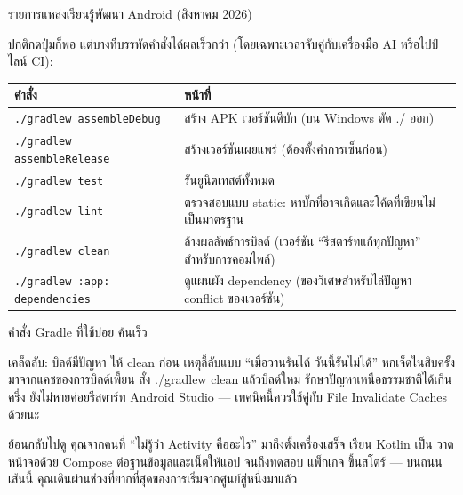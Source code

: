 \begin{center}\small\color{gray}รายการแหล่งเรียนรู้พัฒนา Android (สิงหาคม 2026)\end{center}


ปกติกดปุ่มก็พอ แต่บางทีบรรทัดคำสั่งได้ผลเร็วกว่า (โดยเฉพาะเวลาจับคู่กับเครื่องมือ AI หรือไปป์ไลน์ CI):

\begin{center}
\begin{tabularx}{\linewidth}{|X|X|}
\hline
\textbf{คำสั่ง} & \textbf{หน้าที่} \tabularnewline
\hline
\texttt{.\allowbreak /\allowbreak gradlew assembleDebug} & สร้าง APK เวอร์ชันดีบัก (บน Windows ตัด ./ ออก) \tabularnewline
\texttt{.\allowbreak /\allowbreak gradlew assembleRelease} & สร้างเวอร์ชันเผยแพร่ (ต้องตั้งค่าการเซ็นก่อน) \tabularnewline
\texttt{.\allowbreak /\allowbreak gradlew test} & รันยูนิตเทสต์ทั้งหมด \tabularnewline
\texttt{.\allowbreak /\allowbreak gradlew lint} & ตรวจสอบแบบ static: หาบั๊กที่อาจเกิดและโค้ดที่เขียนไม่เป็นมาตรฐาน \tabularnewline
\texttt{.\allowbreak /\allowbreak gradlew clean} & ล้างผลลัพธ์การบิลด์ (เวอร์ชัน “รีสตาร์ทแก้ทุกปัญหา” สำหรับการคอมไพล์) \tabularnewline
\texttt{.\allowbreak /\allowbreak gradlew :app: dependencies} & ดูแผนผัง dependency (ของวิเศษสำหรับไล่ปัญหา conflict ของเวอร์ชัน) \tabularnewline
\hline
\end{tabularx}
\end{center}

\begin{center}\small\color{gray}คำสั่ง Gradle ที่ใช้บ่อย ค้นเร็ว\end{center}

\begin{tcbinfo}{เคล็ดลับ: บิลด์มีปัญหา ให้ clean ก่อน}
เหตุลี้ลับแบบ “เมื่อวานรันได้ วันนี้รันไม่ได้” หกเจ็ดในสิบครั้งมาจากแคชของการบิลด์เพี้ยน สั่ง ./gradlew clean แล้วบิลด์ใหม่ รักษาปัญหาเหนือธรรมชาติได้เกินครึ่ง ยังไม่หายค่อยรีสตาร์ท Android Studio — เทคนิคนี้ควรใช้คู่กับ File Invalidate Caches ด้วยนะ

\end{tcbinfo}



ย้อนกลับไปดู คุณจากคนที่ “ไม่รู้ว่า Activity คืออะไร” มาถึงตั้งเครื่องเสร็จ เรียน Kotlin เป็น วาดหน้าจอด้วย Compose ต่อฐานข้อมูลและเน็ตให้แอป จนถึงทดสอบ แพ็กเกจ ขึ้นสโตร์ — บนถนนเส้นนี้ คุณเดินผ่านช่วงที่ยากที่สุดของการเริ่มจากศูนย์สู่หนึ่งมาแล้ว

